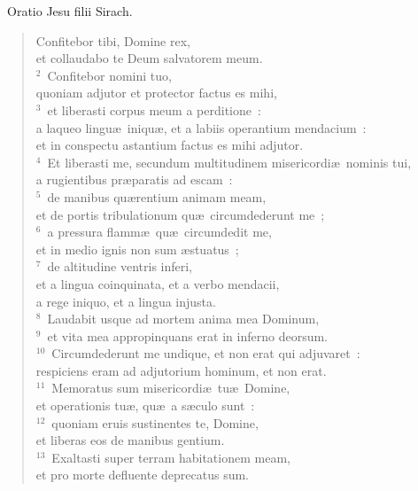 ~\lettrine[lines=10,image=true,loversize=0.05,lraise=-0.03]{O}{}ratio Jesu filii Sirach. \begin{flushleft}\begin{verse}\vspace{6pt}Confitebor tibi, Domine rex,\\ et collaudabo te Deum salvatorem meum.\\
${}^{2}$~Confitebor nomini tuo,\\ quoniam adjutor et protector factus es mihi,\\
${}^{3}$~et liberasti corpus meum a perditione~:\\ a laqueo lingu\ae\ iniqu\ae , et a labiis operantium mendacium~:\\ et in conspectu astantium factus es mihi adjutor.\\
${}^{4}$~Et liberasti me, secundum multitudinem misericordi\ae\ nominis tui,\\ a rugientibus pr\ae paratis ad escam~:\\
${}^{5}$~de manibus qu\ae rentium animam meam,\\ et de portis tribulationum qu\ae\ circumdederunt me~;\\
${}^{6}$~a pressura flamm\ae\ qu\ae\ circumdedit me,\\ et in medio ignis non sum \ae stuatus~;\\
${}^{7}$~de altitudine ventris inferi,\\ et a lingua coinquinata, et a verbo mendacii,\\ a rege iniquo, et a lingua injusta.\\
${}^{8}$~Laudabit usque ad mortem anima mea Dominum,\\
${}^{9}$~et vita mea appropinquans erat in inferno deorsum.\\
${}^{10}$~Circumdederunt me undique, et non erat qui adjuvaret~:\\ respiciens eram ad adjutorium hominum, et non erat.\\
${}^{11}$~Memoratus sum misericordi\ae\ tu\ae\ Domine,\\ et operationis tu\ae , qu\ae\ a s\ae culo sunt~:\\
${}^{12}$~quoniam eruis sustinentes te, Domine,\\ et liberas eos de manibus gentium.\\
${}^{13}$~Exaltasti super terram habitationem meam,\\ et pro morte defluente deprecatus sum.\\

\end{verse}
\end{flushleft}
